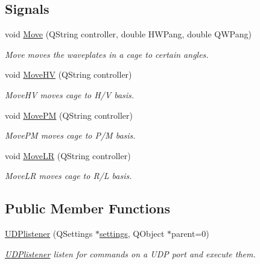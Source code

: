 \subsection*{Signals}
\begin{DoxyCompactItemize}
\item 
void \hyperlink{classUDPlistener_a03cb7a923fb064f41395f8db9409e511}{Move} (Q\+String controller, double H\+W\+Pang, double Q\+W\+Pang)
\begin{DoxyCompactList}\small\item\em Move moves the waveplates in a cage to certain angles. \end{DoxyCompactList}\item 
void \hyperlink{classUDPlistener_a3d16ae857b48ba56257008a008b4e6ee}{Move\+HV} (Q\+String controller)
\begin{DoxyCompactList}\small\item\em Move\+HV moves cage to H/V basis. \end{DoxyCompactList}\item 
void \hyperlink{classUDPlistener_a3e3521c57796737bb229eeadb2f2fdfe}{Move\+PM} (Q\+String controller)
\begin{DoxyCompactList}\small\item\em Move\+PM moves cage to P/M basis. \end{DoxyCompactList}\item 
void \hyperlink{classUDPlistener_aefb57eacf9148d294952db636eefa9ac}{Move\+LR} (Q\+String controller)
\begin{DoxyCompactList}\small\item\em Move\+LR moves cage to R/L basis. \end{DoxyCompactList}\end{DoxyCompactItemize}
\subsection*{Public Member Functions}
\begin{DoxyCompactItemize}
\item 
\hyperlink{classUDPlistener_a789cb6a7b7347a2df5cdc85a457bde4a}{U\+D\+Plistener} (Q\+Settings $\ast$\hyperlink{classUDPlistener_a14614017bcc3fc38e0caad8d4a9781a6}{settings}, Q\+Object $\ast$parent=0)
\begin{DoxyCompactList}\small\item\em \hyperlink{classUDPlistener}{U\+D\+Plistener} listen for commands on a U\+DP port and execute them. \end{DoxyCompactList}\end{DoxyCompactItemize}
